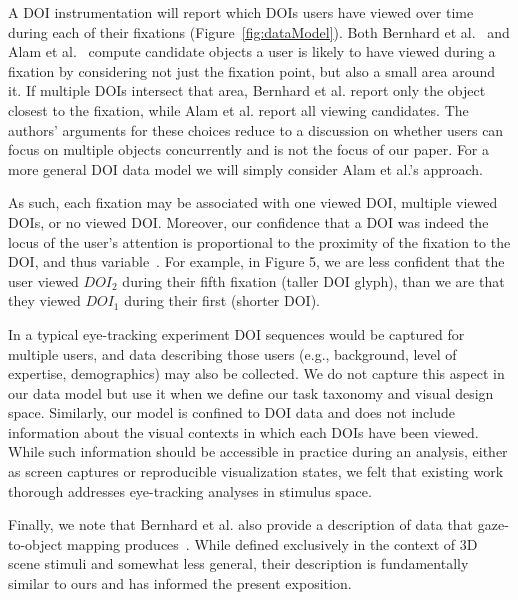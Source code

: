 A DOI instrumentation will report which DOIs users have viewed over time during each of their fixations (Figure~\ref{fig:dataModel}). Both Bernhard et al.~\cite{bernhard2014gaze} and Alam et al.~\cite{alam15analyzing} compute candidate objects a user is likely to have viewed during a fixation by considering not just the fixation point, but also a small area around it.  If multiple DOIs intersect that area, Bernhard et al. report only the object closest to the fixation, while Alam et al. report all viewing candidates.  The authors' arguments for these choices reduce to a discussion on whether users can focus on multiple objects concurrently and is not the focus of our paper. For a more general DOI data model we will simply consider Alam et al.'s approach. 

As such, each fixation may be associated with one viewed DOI, multiple viewed DOIs, or no viewed DOI. Moreover, our confidence that a DOI was indeed the locus of the user's attention is proportional to the proximity of the fixation to the DOI, and thus variable~\cite{alam15analyzing}. For example, in Figure 5, we are less confident that the user viewed $DOI_2$ during their fifth fixation (taller DOI glyph), than we are that they viewed $DOI_1$ during their first (shorter DOI). 

In a typical eye-tracking experiment DOI sequences would be captured for multiple users, and data describing those users (e.g., background, level of expertise, demographics) may also be collected. We do not capture this aspect in our data model but use it when we define our task taxonomy and visual design space. Similarly, our model is confined to DOI data and does not include information about the visual contexts in which each DOIs have been viewed.  While such information should be accessible in practice during an analysis, either as screen captures or reproducible visualization states, we felt that existing work thorough addresses eye-tracking analyses in stimulus space. 

Finally, we note that Bernhard et al. also provide a description of data that gaze-to-object mapping produces~\cite{bernhard2014gaze}. While defined exclusively in the context of 3D scene stimuli and somewhat less general, their description is fundamentally similar to ours and has informed the present exposition. 


